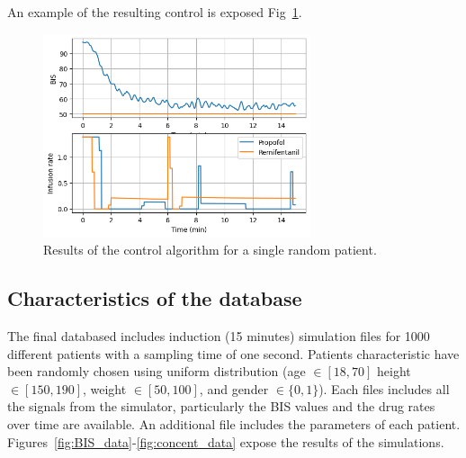 An example of the resulting control is exposed Fig~\ref{fig:test_control}.

\begin{figure}
\center
\includegraphics[width=0.7\textwidth]{images/test_control.png}
\caption{Results of the control algorithm for a single random patient.}
\label{fig:test_control}
\end{figure}

\subsection{Characteristics of the database}

The final databased includes induction (15 minutes) simulation files for 1000 different patients with a sampling time of one second. Patients characteristic have been randomly chosen using uniform distribution (age $\in [18,70]$ height $ \in [150, 190]$, weight $\in[50,100]$, and gender $\in \{0,1\}$). Each files includes all the signals from the simulator, particularly the BIS values and the drug rates over time are available. An additional file includes the parameters of each patient. Figures~\ref{fig:BIS_data}-\ref{fig:concent_data} expose the results of the simulations.

